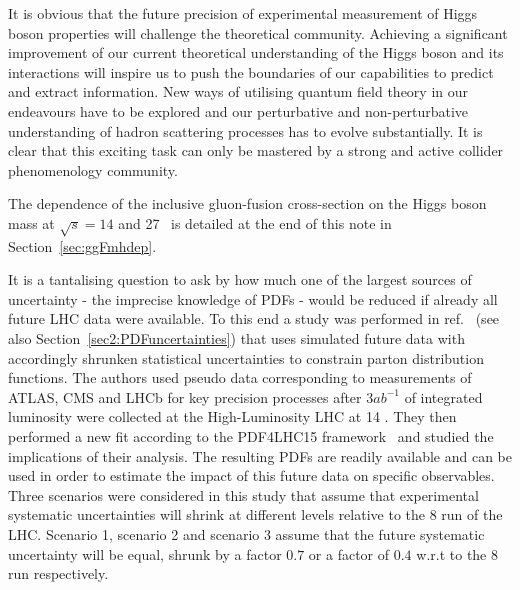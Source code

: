 It is obvious that the future precision of experimental measurement of Higgs boson properties will challenge the theoretical community.
Achieving a significant improvement of our current theoretical understanding of the Higgs boson and its interactions will inspire us to push the boundaries of our capabilities to predict and extract information.
New ways of utilising quantum field theory in our endeavours have to be explored and our perturbative and non-perturbative understanding of hadron scattering processes has to evolve substantially. 
It is clear that this exciting task can only be mastered by a strong and active collider phenomenology community.
 
The dependence of the inclusive gluon-fusion cross-section on the Higgs boson mass at $\sqrt{s}=14$ and 27~\UTeV
is detailed at the end of this note in Section~\ref{sec:ggFmhdep}.


It is a tantalising question to ask by how much one of the largest sources of uncertainty - the imprecise knowledge of PDFs - would be reduced if already all future LHC data were available.
To this end a study was performed in ref.~\cite{Khalek:2018mdn} (see also Section~\ref{sec2:PDFuncertainties}) that uses simulated future data with accordingly shrunken statistical uncertainties to constrain parton distribution functions.
The authors used pseudo data corresponding to measurements of ATLAS, CMS and LHCb for key precision processes after $3 ab^{-1}$ of integrated luminosity were collected at the High-Luminosity LHC at 14 \UTeV.
They then performed a new fit according to the PDF4LHC15 framework~\cite{Botje:2011sn} and studied the implications of their analysis.
The resulting PDFs are readily available and can be used in order to estimate the impact of this future data on specific observables. 
Three scenarios were considered in this study that assume that experimental systematic uncertainties will shrink at different levels relative to the 8 \UTeV run of the LHC.
Scenario 1, scenario 2 and scenario 3 assume that the future systematic uncertainty will be equal, shrunk by a factor $0.7$ or a factor of $0.4$ w.r.t to the 8 \UTeV run respectively.

